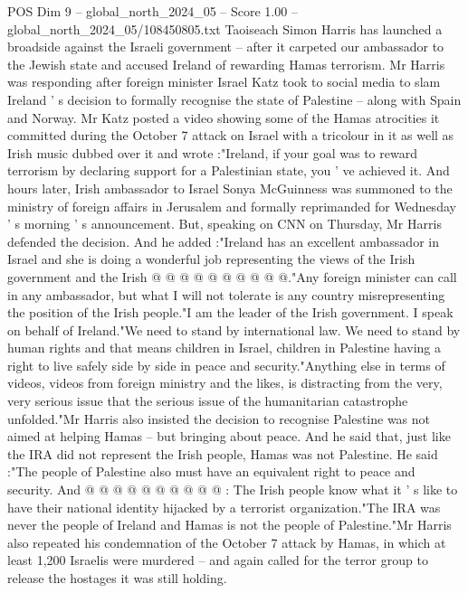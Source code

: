 \begin{textsample}{POS Dim 9 – global\_north\_2024\_05 – Score 1.00 – global\_north\_2024\_05/108450805.txt}  \label{ex:f9_pos_296}
Taoiseach Simon Harris has launched a broadside against the Israeli government -- after it carpeted our ambassador to the Jewish state and accused Ireland of rewarding Hamas terrorism.
Mr Harris was responding after foreign minister Israel Katz took to social media to slam Ireland ' s decision to formally recognise the state of Palestine -- along with Spain and Norway.
Mr Katz posted a video showing some of the Hamas atrocities it committed during the October 7 attack on Israel with a tricolour in it as well as Irish music dubbed over it and wrote :"Ireland, if your goal was to reward terrorism by declaring support for a Palestinian state, you ' ve achieved it.
And hours later, Irish ambassador to Israel Sonya McGuinness was summoned to the ministry of foreign affairs in Jerusalem and formally reprimanded for Wednesday ' s morning ' s announcement.
But, speaking on CNN on Thursday, Mr Harris defended the decision.
And he added :"Ireland has an excellent ambassador in Israel and she is doing a wonderful job representing the views of the Irish government and the Irish @ @ @ @ @ @ @ @ @ @."Any foreign minister can call in any ambassador, but what I will not tolerate is any country misrepresenting the position of the Irish people."I am the leader of the Irish government.
I speak on behalf of Ireland."We need to stand by international law.
We need to stand by human rights and that means children in Israel, children in Palestine having a right to live safely side by side in peace and security."Anything else in terms of videos, videos from foreign ministry and the likes, is distracting from the very, very serious issue that the serious issue of the humanitarian catastrophe unfolded."Mr Harris also insisted the decision to recognise Palestine was not aimed at helping Hamas -- but bringing about peace.
And he said that, just like the IRA did not represent the Irish people, Hamas was not Palestine.
He said :"The people of Palestine also must have an equivalent right to peace and security.
And @ @ @ @ @ @ @ @ @ @ : The Irish people know what it ' s like to have their national identity hijacked by a terrorist organization."The IRA was never the people of Ireland and Hamas is not the people of Palestine."Mr Harris also repeated his condemnation of the October 7 attack by Hamas, in which at least 1,200 Israelis were murdered -- and again called for the terror group to release the hostages it was still holding.

\end{textsample}
